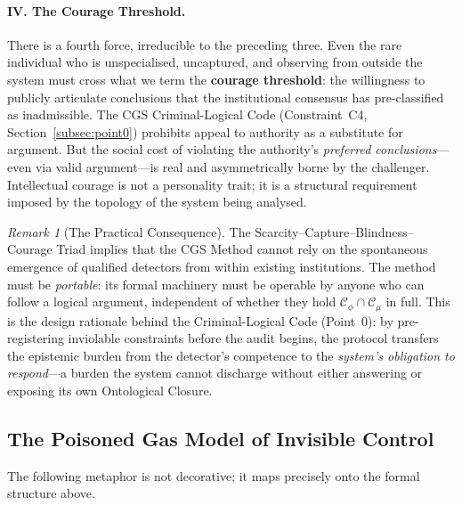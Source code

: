 \documentclass[11pt,a4paper]{article}
\theoremstyle{definition}
\theoremstyle{plain}
\theoremstyle{remark}
\newtheorem{remark}{Remark}[section]
\begin{document}
\paragraph{IV. The Courage Threshold.}
There is a fourth force, irreducible to the preceding three.
Even the rare individual who is unspecialised, uncaptured, and observing from
outside the system must cross what we term the \textbf{courage threshold}:
the willingness to publicly articulate conclusions that the institutional
consensus has pre-classified as inadmissible.
The CGS Criminal-Logical Code (Constraint~C4, Section~\cref{subsec:point0})
prohibits appeal to authority as a substitute for argument.
But the social cost of violating the authority's \emph{preferred conclusions}---
even via valid argument---is real and asymmetrically borne by the challenger.
Intellectual courage is not a personality trait; it is a structural requirement
imposed by the topology of the system being analysed.

\begin{remark}[The Practical Consequence]
The Scarcity--Capture--Blindness--Courage Triad implies that the CGS Method
cannot rely on the spontaneous emergence of qualified detectors from within
existing institutions.
The method must be \emph{portable}: its formal machinery must be operable by
anyone who can follow a logical argument, independent of whether they
hold $\mathcal{C}_\phi \cap \mathcal{C}_\mu$ in full.
This is the design rationale behind the Criminal-Logical Code (Point~0):
by pre-registering inviolable constraints before the audit begins, the protocol
transfers the epistemic burden from the detector's competence to the
\emph{system's obligation to respond}---a burden the system cannot discharge
without either answering or exposing its own Ontological Closure.
\end{remark}


\subsection{The Poisoned Gas Model of Invisible Control}
\label{apx:poisoned-gas}

The following metaphor is not decorative; it maps precisely onto the formal structure
above.
\end{document}
